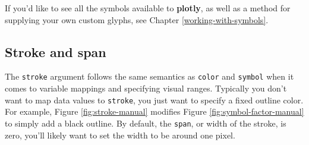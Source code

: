 \documentclass[
  12pt,
]{krantz}
\newenvironment{Shaded}{\begin{snugshade}}{\end{snugshade}}
\newcommand{\DataTypeTok}[1]{\textcolor[rgb]{0.13,0.29,0.53}{#1}}
\newcommand{\DecValTok}[1]{\textcolor[rgb]{0.00,0.00,0.81}{#1}}
\newcommand{\FloatTok}[1]{\textcolor[rgb]{0.00,0.00,0.81}{#1}}
\newcommand{\KeywordTok}[1]{\textcolor[rgb]{0.13,0.29,0.53}{\textbf{#1}}}
\newcommand{\NormalTok}[1]{#1}
\newcommand{\OperatorTok}[1]{\textcolor[rgb]{0.81,0.36,0.00}{\textbf{#1}}}
\newcommand{\StringTok}[1]{\textcolor[rgb]{0.31,0.60,0.02}{#1}}
\begin{document}
If you'd like to see all the symbols available to \textbf{plotly}, as well as a method for supplying your own custom glyphs, see Chapter \ref{working-with-symbols}.

\hypertarget{marker-stroke}{%
\subsection{Stroke and span}\label{marker-stroke}}


The \texttt{stroke} argument follows the same semantics as \texttt{color} and \texttt{symbol} when it comes to variable mappings and specifying visual ranges. Typically you don't want to map data values to \texttt{stroke}, you just want to specify a fixed outline color. For example, Figure \ref{fig:stroke-manual} modifies Figure \ref{fig:symbol-factor-manual} to simply add a black outline. By default, the \texttt{span}, or width of the stroke, is zero, you'll likely want to set the width to be around one pixel.

\begin{Shaded}
\end{Shaded}
\end{document}
